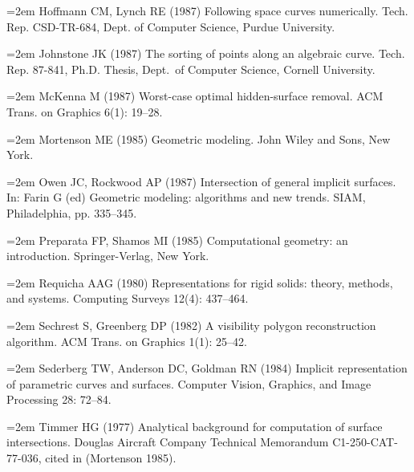 \hangindent=2em  %
\noindent 
Hoffmann CM, Lynch RE (1987) 
Following space curves numerically.
Tech. Rep. CSD-TR-684, Dept. of Computer Science, Purdue University.

\hangindent=2em  %
\noindent 
Johnstone JK (1987) The sorting of points along an algebraic curve.
Tech. Rep. 87-841, Ph.D. Thesis, Dept.\ of Computer Science, Cornell University.

\hangindent=2em  %
\noindent 
McKenna M (1987)
Worst-case optimal hidden-surface removal.
ACM Trans. on Graphics 6(1): 19--28.


\hangindent=2em  %
\noindent 
Mortenson ME (1985) Geometric modeling.
John Wiley and Sons, New York.

\hangindent=2em  %
\noindent 
Owen JC, Rockwood AP (1987)
Intersection of general implicit surfaces.
In: Farin G (ed) \mbox{Geometric} modeling: algorithms and new trends.
SIAM, Philadelphia, pp. 335--345.

\hangindent=2em  %
\noindent 
Preparata FP, Shamos MI (1985) Computational geometry: an introduction.
Springer-Verlag, New York.

\hangindent=2em  %
\noindent 
Requicha AAG (1980) 
Representations for rigid solids: theory, methods, and systems.
Computing Surveys 12(4): 437--464.

\hangindent=2em  %
\noindent 
Sechrest S, Greenberg DP (1982)
A visibility polygon reconstruction algorithm.
ACM Trans. on Graphics 1(1): 25--42.

\hangindent=2em  %
\noindent 
Sederberg TW, Anderson DC, Goldman RN (1984)
Implicit representation of parametric curves and surfaces.
Computer Vision, Graphics, and Image Processing 28: 72--84.

\hangindent=2em  %
\noindent 
Timmer HG (1977) 
Analytical background for computation of surface intersections.
Douglas Aircraft Company Technical Memorandum C1-250-CAT-77-036, 
cited in (Mortenson 1985). 

